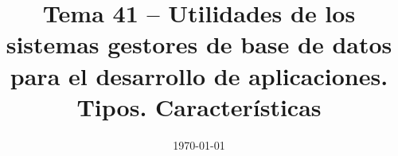 \documentclass[12pt]{report}
\title{\textbf{Tema 41 – Utilidades de los sistemas gestores de base de datos para el desarrollo de aplicaciones. Tipos. Características}}
\author{}
\date{\today}
\begin{document}
\maketitle
\tableofcontents
\bigskip










\end{document}
